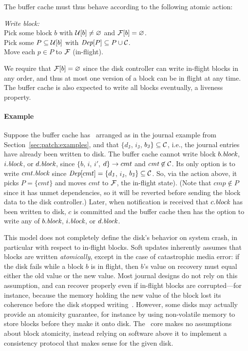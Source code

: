 The buffer cache must thus behave according to the following atomic action:

\begin{tabbing}
\textit{Write block:} \\
\quad Pick some block $b$ with $\PMem[b] \neq \emptyset$ and $\PInf[b] =
\emptyset$. \\
\quad Pick some $P \subseteq \PMem[b]$ with $\PDepset{P} \subseteq P \cup
\PDisk$. \\
\quad Move each $p \in P$ to $\PInf$ (in-flight).
\end{tabbing}

\noindent
%
We require that $\PInf[b] = \emptyset$ since the disk controller can write
in-flight blocks in any order, and thus at most one version of a block can
be in flight at any time.
%
The buffer cache is also expected to write all blocks eventually, a
 liveness property.

\paragraph{Example}
%
Suppose the buffer cache has \patches\ arranged as in the journal example from
Section~\ref{sec:patch:examples}, and that $\{d_\textrm{J}$, $i_\textrm{J}$,
$b_\textrm{J}\} \subseteq \PDisk$, i.e., the journal entries have already been
written to disk.
%
The buffer cache cannot write block $b.\textit{block}$, $i.\textit{block}$, or $d.\textit{block}$,
since $\{b$, $i$, $i'$, $d\} \rightarrow cmt$ and $\textit{cmt} \not\in \PDisk$.
%
Its only option is to write $cmt.\textit{block}$ since $\textit{Dep}[cmt] =
\{d_\textrm{J}$, $i_\textrm{J}$, $b_\textrm{J}\} \subseteq \PDisk$.
%
So, via the action above, it picks $P = \{cmt\}$ and moves $\textit{cmt}$
to $\PInf$, the in-flight state). (Note that $cmp \not \in P$ since it has unmet dependencies, so it
will be reverted before sending the block data to the disk controller.)
%
Later, when notification is received that $c.\textit{block}$ has been written to disk,
$c$ is committed and the buffer cache then has the option to
write any of $b.\textit{block}$, $i.\textit{block}$, or $d.\textit{block}$.

This model does not completely define the disk's behavior on system crash,
 in particular with respect to in-flight blocks.
%
Soft updates inherently assumes that blocks are written
\emph{atomically}, except in the case of catastrophic media error:
%
if the disk fails while a block $b$ is in flight, then $b$'s
value on recovery must equal either the old value or the new value.
%
Most journal designs do not rely on this assumption, and can recover
 properly even if in-flight blocks are corrupted---for instance,
 because the memory holding the new value of the block lost its coherence
 before the disk stopped writing~\cite{nightingale06rethink}.
%
However, some disks may actually provide an atomicity guarantee, for
 instance by using non-volatile memory to store blocks before they make it
 onto disk.
%
The \Kudos\ core makes no assumptions about block atomicity, instead relying
 on software above it to implement a consistency protocol that makes sense
 for the given disk.


